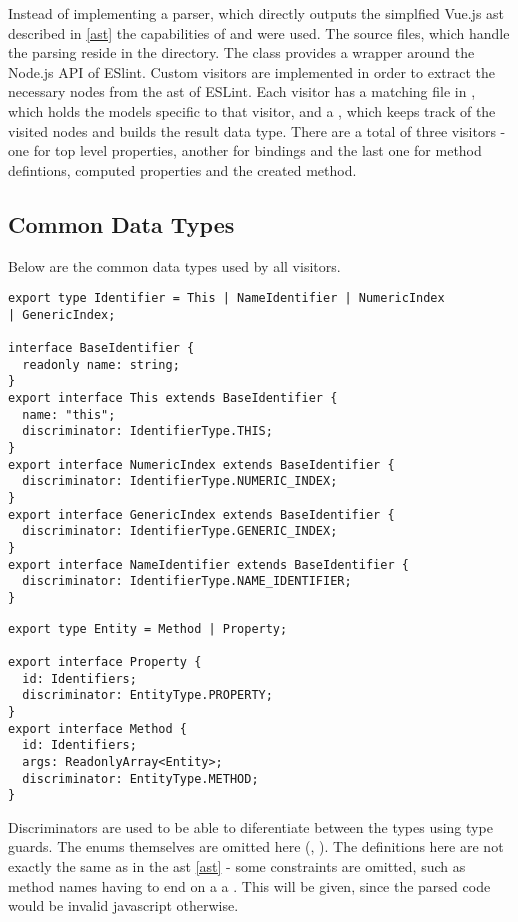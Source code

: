 Instead of implementing a parser, which directly outputs the simplfied Vue.js \gls{ast} described in \ref{ast} the capabilities of \textcite{eslintMainPage}  %
and \parencite{eslint_vue_parser} were used. 
The source files, which handle the parsing reside in the  directory.
The  class provides a wrapper around the Node.js API of ESlint. Custom visitors are implemented in order to extract the necessary nodes from the \gls{ast} of ESLint. Each visitor has a matching file in , which holds the models specific to that visitor, and a , which keeps track of the visited nodes and builds the result data type. There are a total of three visitors - one for top level properties, another for bindings and the last one for method defintions, computed properties and the created method.
 
\subsection{Common Data Types}
Below are the common data types used by all visitors.
\begin{lstlisting}
export type Identifier = This | NameIdentifier | NumericIndex 
| GenericIndex;

interface BaseIdentifier {
  readonly name: string;
}
export interface This extends BaseIdentifier {
  name: "this";
  discriminator: IdentifierType.THIS;
}
export interface NumericIndex extends BaseIdentifier {
  discriminator: IdentifierType.NUMERIC_INDEX;
}
export interface GenericIndex extends BaseIdentifier {
  discriminator: IdentifierType.GENERIC_INDEX;
}
export interface NameIdentifier extends BaseIdentifier {
  discriminator: IdentifierType.NAME_IDENTIFIER;
}
\end{lstlisting}

\begin{lstlisting} 
export type Entity = Method | Property;

export interface Property {
  id: Identifiers;
  discriminator: EntityType.PROPERTY;
}
export interface Method {
  id: Identifiers;
  args: ReadonlyArray<Entity>;
  discriminator: EntityType.METHOD;
}
\end{lstlisting}
Discriminators are used to be able to diferentiate between the types using type guards. The enums themselves are omitted here (, ). The definitions here are not exactly the same as in the \gls{ast} \ref{ast} - some constraints are omitted, such as method names having to end on a a . This will be given, since the parsed code would be invalid javascript otherwise.
